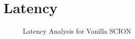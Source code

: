 \section{Latency}
\begin{figure}[th!!]
\centering
\noindent
{}
\decoRule
\caption[Latency Analysis]{Latency Analysis for Vanilla SCION}
\label{fig:perf_ephid}
\end{figure}